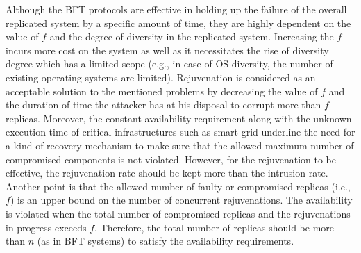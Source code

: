 \documentclass[preprint,number,12pt]{elsarticle}
\begin{document}
Although the BFT protocols are effective in holding up the failure of the overall replicated system by a specific amount of time, they are highly dependent on the value of $f$ and the degree of diversity in the replicated system\citep{Bessani2011a}. Increasing the $f$ incurs more cost on the system as well as it necessitates the rise of diversity degree which has a limited scope (e.g., in case of OS diversity, the number of existing operating systems  are limited). Rejuvenation is considered as an acceptable solution to the mentioned problems by decreasing the value of $f$ and the duration of time the attacker has at his disposal to corrupt more than $f$ replicas. Moreover, the constant availability requirement along with the unknown execution time of critical infrastructures such as smart grid underline the need for a kind of recovery mechanism to make sure that the allowed maximum number of compromised components is not violated. However, for the rejuvenation to be effective, the rejuvenation rate should be kept more than the intrusion rate\citep{Sousa2006}. Another point is that the allowed number of faulty or compromised replicas (i.e., $f$) is an upper bound on the number of concurrent rejuvenations. The availability is violated when the total number of compromised replicas and the rejuvenations in progress exceeds $f$. Therefore, the total number of replicas should be more than $n$ (as in BFT systems) to satisfy the availability requirements\citep{Sousa2008}.
\end{document}
